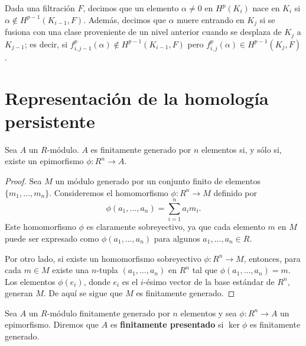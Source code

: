 \begin{definicion}
	Dada una filtración \(F\), decimos que un elemento \(\alpha \neq 0\) en \(H^p(K_i)\) nace en \(K_i\) si \(\alpha \not\in H^{p-1}(K_{i-1},F)\). Además, decimos que \(\alpha\) muere entrando en \(K_j\) si se fusiona con una clase proveniente de un nivel anterior cuando se desplaza de \(K_j\) a \(K_{j-1}\); es decir, si \(f_{i,j-1}^p(\alpha) \not\in H^{p-1}(K_{i-1},F)\) pero \(f_{i,j}^p(\alpha) \in H^{p-1}(K_j,F)\).
\end{definicion}

\section{Representación de la homología persistente}
\begin{lema}
	Sea \( A \) un \( R \)-módulo. \( A \) es finitamente generado por \( n \) elementos si, y sólo si, existe un epimorfismo \( \phi : R^n \to A \).
\end{lema}

\begin{proof}
	Sea \( M \) un módulo generado por un conjunto finito de elementos \( \{m_1, \ldots, m_n\} \). Consideremos el homomorfismo \( \phi: R^n \rightarrow M \) definido por
	\[
	\phi(a_1, \ldots, a_n) = \sum_{i=1}^n a_i m_i.
	\]
	Este homomorfismo \( \phi \) es claramente sobreyectivo, ya que cada elemento \( m \) en \( M \) puede ser expresado como \( \phi(a_1, \ldots, a_n) \) para algunos \( a_1, \ldots, a_n \in R \).
	
	Por otro lado, si existe un homomorfismo sobreyectivo \( \phi: R^n \rightarrow M \), entonces, para cada \( m \in M \) existe una \( n \)-tupla \( (a_1, \ldots, a_n) \) en \( R^n \) tal que \( \phi(a_1, \ldots, a_n) = m \). Los elementos \( \phi(e_i) \), donde \( e_i \) es el \( i \)-ésimo vector de la base estándar de \( R^n \), generan \( M \). De aquí se sigue que \( M \) es finitamente generado.
\end{proof}

\begin{definicion}
	Sea \( A \) un \( R \)-módulo finitamente generado por \( n \) elementos y sea \( \phi : R^n \to A \) un epimorfismo. Diremos que \( A \) es \textbf{finitamente presentado} si \( \ker \phi \) es finitamente generado.
\end{definicion}

